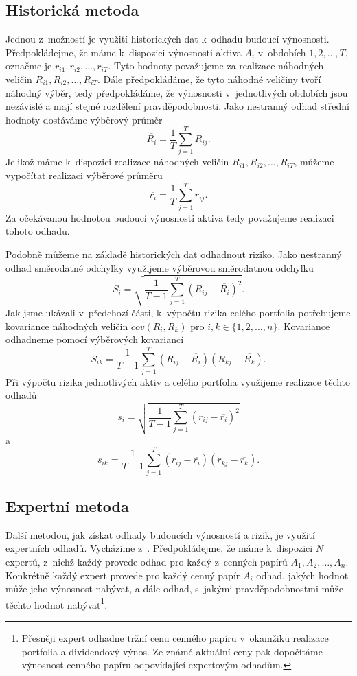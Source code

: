 \documentclass[12pt,a4paper]{report}
\begin{document}
\subsection{Historická metoda}
Jednou z~možností je využití historických dat k~odhadu budoucí výnosnosti. Předpokládejme, že máme k~dispozici výnosnosti aktiva $A_i$ v~obdobích $1,2,\dots,T$, označme je $r_{i1},r_{i2},\dots,r_{iT}$. Tyto hodnoty považujeme za realizace náhodných veličin $R_{i1},R_{i2},\dots,R_{iT}$. Dále předpokládáme, že tyto náhodné veličiny tvoří náhodný výběr, tedy předpokládáme, že výnosnosti v~jednotlivých obdobích jsou nezávislé a mají stejné rozdělení pravděpodobnosti. Jako nestranný odhad střední hodnoty dostáváme výběrový průměr
\[
\overline{R_i}=\frac{1}{T}\sum_{j=1}^T R_{ij}.
\]
Jelikož máme k~dispozici realizace náhodných veličin $R_{i1},R_{i2},\dots,R_{iT}$, můžeme vypočítat realizaci výběrové průměru
\[
\overline{r_i}=\frac{1}{T}\sum_{j=1}^T r_{ij}.
\]
Za očekávanou hodnotou budoucí výnosnosti aktiva tedy považujeme realizaci tohoto odhadu.

Podobně můžeme na základě historických dat odhadnout riziko. Jako nestranný odhad směrodatné odchylky využijeme výběrovou směrodatnou odchylku
\[
S_i=\sqrt{\frac{1}{T-1}\sum_{j=1}^T (R_{ij}-\overline{R_i})^2}.
\]
Jak jsme ukázali v~předchozí části, k~výpočtu rizika celého portfolia potřebujeme kovariance náhodných veličin $cov(R_i,R_k)$ pro $i,k \in \{1,2,\dots,n\}$. Kovariance odhadneme pomocí výběrových kovariancí
\[
S_{ik}=\frac{1}{T-1}\sum_{j=1}^T (R_{ij}-\overline{R_i})(R_{kj}-\overline{R_k}).
\]
Při výpočtu rizika jednotlivých aktiv a celého portfolia využijeme realizace těchto odhadů
 \[
s_i=\sqrt{\frac{1}{T-1}\sum_{j=1}^T (r_{ij}-\overline{r_i})^2}
\]
a
\[
s_{ik}=\frac{1}{T-1}\sum_{j=1}^T (r_{ij}-\overline{r_i})(r_{kj}-\overline{r_k}).
\]

\subsection{Expertní metoda}
Další metodou, jak získat odhady budoucích výnosností a rizik, je využití expertních odhadů. Vycházíme z~\cite{camsky}. Předpokládejme, že máme k~dispozici $N$ expertů, z~nichž každý provede odhad pro každý z~cenných papírů $A_1,A_2,\dots,A_n$. Konkrétně každý expert provede pro každý cenný papír $A_i$ odhad, jakých hodnot může jeho výnosnost nabývat, a dále odhad, s~jakými pravděpodobnostmi může těchto hodnot nabývat\footnote{Přesněji expert odhadne tržní cenu cenného papíru v~okamžiku realizace portfolia a dividendový výnos. Ze známé aktuální ceny pak dopočítáme výnosnost cenného papíru odpovídající expertovým odhadům.}.
\end{document}
